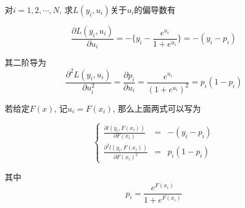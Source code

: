 \begin{remark}
    对$i=1,2,\cdots, N$, 求$L(y_i, u_i)$关于$u_i$的偏导数有

    \begin{equation}
        \frac{\partial L(y_i, u_i)}{\partial u_i} = -\Big\{y_i - \frac{e^{u_i}}{1 + e^{u_i}} \Big\} =  -(y_i - p_i)
    \end{equation}

    其二阶导为
    \begin{equation}
        \frac{\partial^2 L(y_i, u_i)}{\partial u_i^2} = \frac{\partial p_i}{\partial u_i} = \frac{e^{u_i}}{(1 + e^{u_i})^2} = p_i(1-p_i)
    \end{equation}

    若给定$F(x)$, 记$u_i=F(x_i)$, 那么上面两式可以写为

    \begin{equation}\label{partial_12}
        \left\{
        \begin{array}{rcl}
            \frac{\partial l(y_i, F(x_i))}{\partial F(x_i)}     & = & -(y_i - p_i) \\
            \frac{\partial^2 l(y_i, F(x_i))}{\partial F(x_i)^2} & = & p_i(1-p_i)
        \end{array}
        \right.
    \end{equation}

    其中
    \begin{equation*}
        p_i = \frac{e^{F(x_i)}}{1 + e^{F(x_i)}}
    \end{equation*}

\end{remark}

